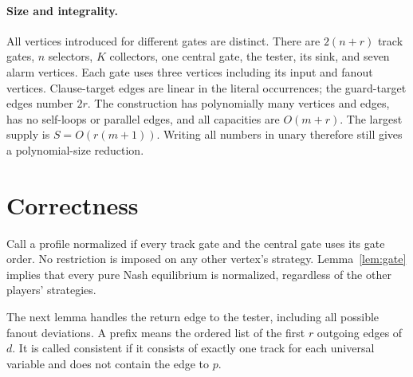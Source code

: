 \documentclass[11pt]{article}
\begin{document}
\paragraph{Size and integrality.}
All vertices introduced for different gates are distinct. There are $2(n+r)$ track gates, $n$ selectors, $K$ collectors, one central gate, the tester, its sink, and seven alarm vertices. Each gate uses three vertices including its input and fanout vertices. Clause-target edges are linear in the literal occurrences; the guard-target edges number $2r$. The construction has polynomially many vertices and edges, has no self-loops or parallel edges, and all capacities are $O(m+r)$. The largest supply is $S=O(r(m+1))$. Writing all numbers in unary therefore still gives a polynomial-size reduction.

\FloatBarrier
\section{Correctness}
Call a profile normalized if every track gate and the central gate uses its gate order. No restriction is imposed on any other vertex's strategy. Lemma~\ref{lem:gate} implies that every pure Nash equilibrium is normalized, regardless of the other players' strategies.

The next lemma handles the return edge to the tester, including all possible fanout deviations. A prefix means the ordered list of the first $r$ outgoing edges of $d$. It is called consistent if it consists of exactly one track for each universal variable and does not contain the edge to $p$.
\end{document}

